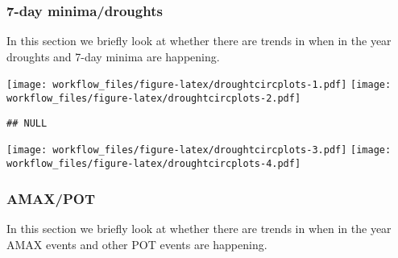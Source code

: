 \documentclass[
]{article}
\newenvironment{Shaded}{\begin{snugshade}}{\end{snugshade}}
\newcommand{\AttributeTok}[1]{\textcolor[rgb]{0.77,0.63,0.00}{#1}}
\newcommand{\DecValTok}[1]{\textcolor[rgb]{0.00,0.00,0.81}{#1}}
\newcommand{\FunctionTok}[1]{\textcolor[rgb]{0.00,0.00,0.00}{#1}}
\newcommand{\NormalTok}[1]{#1}
\newcommand{\OtherTok}[1]{\textcolor[rgb]{0.56,0.35,0.01}{#1}}
\newcommand{\SpecialCharTok}[1]{\textcolor[rgb]{0.00,0.00,0.00}{#1}}
\begin{document}
\hypertarget{day-minimadroughts}{%
\subsubsection{7-day minima/droughts}\label{day-minimadroughts}}

In this section we briefly look at whether there are trends in when in
the year droughts and 7-day minima are happening.

\begin{Shaded}
\end{Shaded}

\texttt{[image: workflow\_files/figure-latex/droughtcircplots-1.pdf]}
\texttt{[image: workflow\_files/figure-latex/droughtcircplots-2.pdf]}

\begin{verbatim}
## NULL
\end{verbatim}

\texttt{[image: workflow\_files/figure-latex/droughtcircplots-3.pdf]}
\texttt{[image: workflow\_files/figure-latex/droughtcircplots-4.pdf]}

\hypertarget{amaxpot}{%
\subsubsection{AMAX/POT}\label{amaxpot}}

In this section we briefly look at whether there are trends in when in
the year AMAX events and other POT events are happening.
\end{document}

